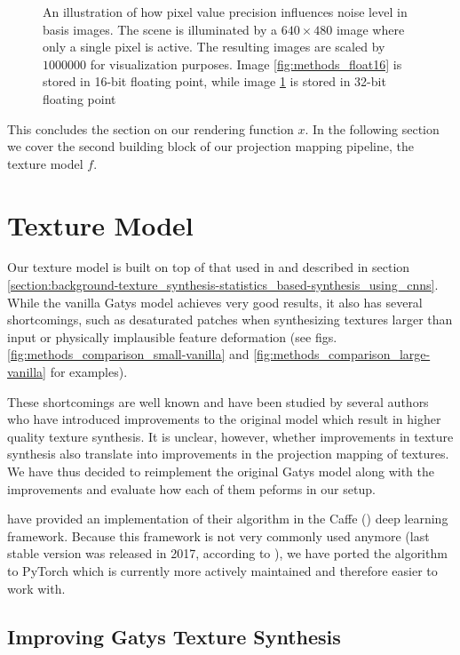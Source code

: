 \begin{figure}[]
\begin{subfigure}[b]{0.48\textwidth}
        \caption{}
        \label{fig:methods_float32}
    \end{subfigure}
    \caption{An illustration of how pixel value precision influences noise level in basis images. The scene is illuminated by a \(640 \times 480\) image where only a single pixel is active. The resulting images are scaled by \(1000000\) for visualization purposes. Image \ref{fig:methods_float16} is stored in 16-bit floating point, while image \ref{fig:methods_float32} is stored in 32-bit floating point}
    \label{fig:methods_float}
\end{figure}

This concludes the section on our rendering function \(x\). In the following section we cover the second building block of our projection mapping pipeline, the texture model \(f\).

\section{Texture Model}
\label{section:methods-texture_model}

Our texture model is built on top of that used in \citet{Gatys2015} and described in section \ref{section:background-texture_synthesis-statistics_based-synthesis_using_cnns}. While the vanilla Gatys model achieves very good results, it also has several shortcomings, such as desaturated patches when synthesizing textures larger than input or physically implausible feature deformation (see figs. \ref{fig:methods_comparison_small-vanilla} and \ref{fig:methods_comparison_large-vanilla} for examples).

These shortcomings are well known and have been studied by several authors who have introduced improvements to the original model which result in higher quality texture synthesis. It is unclear, however, whether improvements in texture synthesis also translate into improvements in the projection mapping of textures. We have thus decided to reimplement the original Gatys model along with the improvements and evaluate how each of them peforms in our setup.

\citet{Gatys2015} have provided an implementation of their algorithm in the Caffe (\citet{Jia2014}) deep learning framework. Because this framework is not very commonly used anymore (last stable version was released in 2017, according to \citet{CaffeGitHub}), we have ported the algorithm to PyTorch which is currently more actively maintained and therefore easier to work with.

\subsection{Improving Gatys Texture Synthesis}
\label{section:methods-texture_model-improvements}

